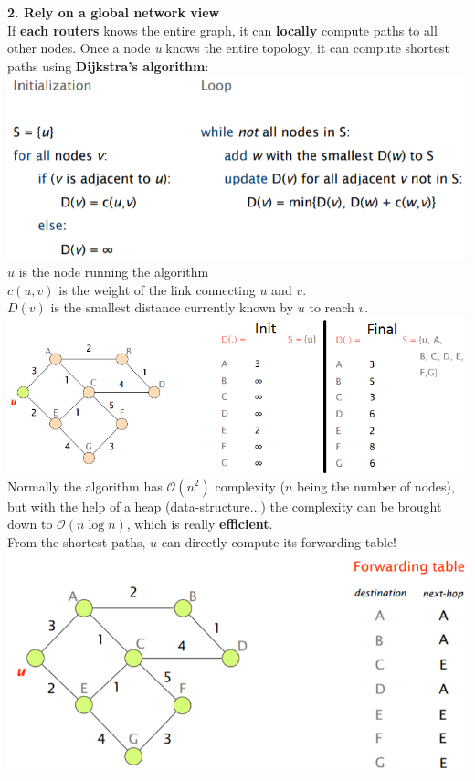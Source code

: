 \documentclass[a4paper, fontsize=8pt, landscape, DIV=1]{scrartcl}
\begin{document}
\begin{multicols*}{4}
			\textbf{2. Rely on a global network view}\\
			If \textbf{each routers} knows the entire graph, it can \textbf{locally} compute paths to all other nodes. Once a node \textit{u} knows the entire topology, it can compute shortest paths using \textbf{Dijkstra's algorithm}:
			\includegraphics[width=\columnwidth]{images/Concepts/Dijkstra.png}
			$u$ is the node running the algorithm\\
			$c(u,v)$ is the weight of the link connecting $u$ and $v$. \\
			$D(v)$ is the smallest distance currently known by $u$ to reach $v$.\\
			\includegraphics[width=\columnwidth]{images/Concepts/Dijkstra_example.png} 
			Normally the algorithm has $\mathcal{O}(n^2)$ complexity ($n$ being the number of nodes), but with the help of a heap (data-structure...) the complexity can be brought down to $\mathcal{O}(n\log n)$, which is really \textbf{efficient}.\\
			From the shortest paths, $u$ can directly compute its forwarding table! 
		    \includegraphics[width=\columnwidth]{images/Concepts/forwarding_table.png} 	 

\end{multicols*}
\end{document}

